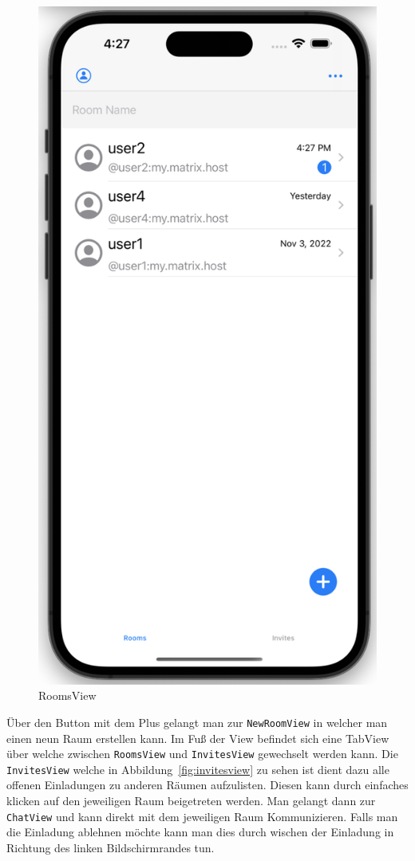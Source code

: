     \begin{figure}[h]
        \includegraphics[scale=0.5]{rooms}
        \centering
        \caption{RoomsView}\label{fig:roomsview}
    \end{figure}
    Über den Button mit dem Plus gelangt man zur \texttt{NewRoomView} in welcher man einen neun Raum erstellen kann.
    Im Fuß der View befindet sich eine TabView über welche zwischen \texttt{RoomsView} und \texttt{InvitesView} gewechselt werden kann.
    Die \texttt{InvitesView} welche in Abbildung~\ref{fig:invitesview} zu sehen ist dient dazu alle offenen Einladungen zu anderen Räumen aufzulisten.
    Diesen kann durch einfaches klicken auf den jeweiligen Raum beigetreten werden.
    Man gelangt dann zur \texttt{ChatView} und kann direkt mit dem jeweiligen Raum Kommunizieren.
    Falls man die Einladung ablehnen möchte kann man dies durch wischen der Einladung in Richtung des linken Bildschirmrandes tun.

